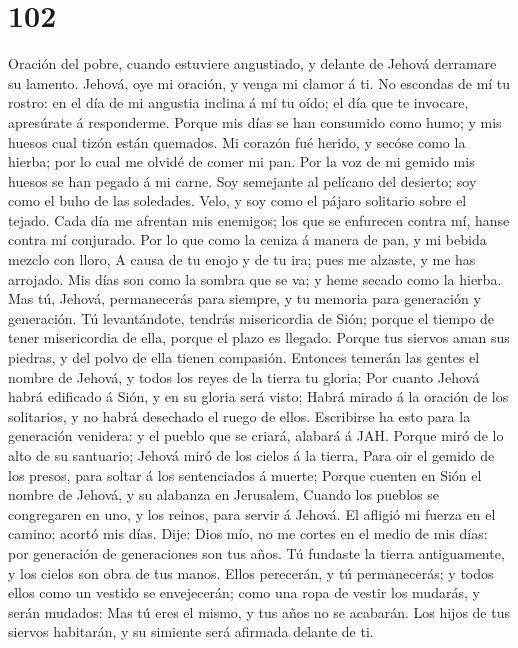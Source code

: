 \hypertarget{section-101}{%
\section{102}\label{section-101}}

 Oración del pobre, cuando estuviere angustiado, y delante
de Jehová derramare su lamento. Jehová, oye mi oración, y venga mi
clamor á ti.  No escondas de mí tu rostro: en el día de mi
angustia inclina á mí tu oído; el día que te invocare, apresúrate á
responderme.  Porque mis días se han consumido como humo;
y mis huesos cual tizón están quemados.  Mi corazón fué
herido, y secóse como la hierba; por lo cual me olvidé de comer mi pan.
 Por la voz de mi gemido mis huesos se han pegado á mi
carne.  Soy semejante al pelícano del desierto; soy como
el buho de las soledades.  Velo, y soy como el pájaro
solitario sobre el tejado.  Cada día me afrentan mis
enemigos; los que se enfurecen contra mí, hanse contra mí conjurado.
 Por lo que como la ceniza á manera de pan, y mi bebida
mezclo con lloro,  A causa de tu enojo y de tu ira; pues
me alzaste, y me has arrojado.  Mis días son como la
sombra que se va; y heme secado como la hierba.  Mas tú,
Jehová, permanecerás para siempre, y tu memoria para generación y
generación.  Tú levantándote, tendrás misericordia de
Sión; porque el tiempo de tener misericordia de ella, porque el plazo es
llegado.  Porque tus siervos aman sus piedras, y del
polvo de ella tienen compasión.  Entonces temerán las
gentes el nombre de Jehová, y todos los reyes de la tierra tu gloria;
 Por cuanto Jehová habrá edificado á Sión, y en su gloria
será visto;  Habrá mirado á la oración de los solitarios,
y no habrá desechado el ruego de ellos.  Escribirse ha
esto para la generación venidera: y el pueblo que se criará, alabará á
JAH.  Porque miró de lo alto de su santuario; Jehová miró
de los cielos á la tierra,  Para oir el gemido de los
presos, para soltar á los sentenciados á muerte;  Porque
cuenten en Sión el nombre de Jehová, y su alabanza en Jerusalem,
 Cuando los pueblos se congregaren en uno, y los reinos,
para servir á Jehová.  El afligió mi fuerza en el camino;
acortó mis días.  Dije: Dios mío, no me cortes en el
medio de mis días: por generación de generaciones son tus años.
 Tú fundaste la tierra antiguamente, y los cielos son
obra de tus manos.  Ellos perecerán, y tú permanecerás; y
todos ellos como un vestido se envejecerán; como una ropa de vestir los
mudarás, y serán mudados:  Mas tú eres el mismo, y tus
años no se acabarán.  Los hijos de tus siervos habitarán,
y su simiente será afirmada delante de ti.

